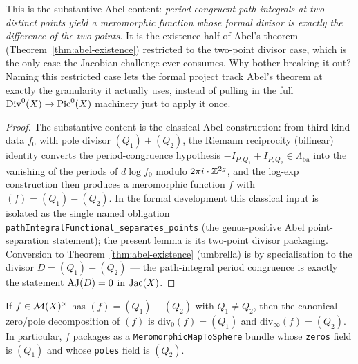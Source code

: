 \begin{layman}
This is the substantive Abel content: \emph{period-congruent path
integrals at two distinct points yield a meromorphic function whose
formal divisor is exactly the difference of the two points.} It is
the existence half of Abel's theorem (Theorem~\ref{thm:abel-existence})
restricted to the two-point divisor case, which is the only case the
Jacobian challenge ever consumes. Why bother breaking it out? Naming
this restricted case lets the formal project track Abel's theorem at
exactly the granularity it actually uses, instead of pulling in the
full \(\operatorname{Div}^0(X) \to \operatorname{Pic}^0(X)\) machinery just to apply it once.

\end{layman}

\begin{proof}\leanok
The substantive content is the classical Abel construction: from
third-kind data \(f_0\) with pole divisor \((Q_1)+(Q_2)\), the
Riemann reciprocity (bilinear) identity converts the period-congruence
hypothesis \(-I_{P,Q_1}+I_{P,Q_2}\in\Lambda_{\mathrm{ba}}\) into the
vanishing of the periods of \(d\log f_0\) modulo \(2\pi i\cdot\mathbb{Z}^{2g}\),
and the log-exp construction then produces a meromorphic function
\(f\) with \((f) = (Q_1) - (Q_2)\). In the formal development this
classical input is isolated as the single named obligation
\texttt{pathIntegralFunctional\_separates\_points} (the genus-positive
Abel point-separation statement); the present lemma is its two-point
divisor packaging. Conversion to Theorem~\ref{thm:abel-existence}
(umbrella) is by specialisation to the divisor \(D = (Q_1) - (Q_2)\)
--- the path-integral period congruence is exactly the statement
\(\operatorname{AJ}(D) = 0\) in \(\operatorname{Jac}(X)\).
\end{proof}

\begin{lemma}
\label{lem:two-point-principal-packaging}

If \(f\in\mathcal{M}(X)^\times\) has \((f) = (Q_1) - (Q_2)\) with
\(Q_1\neq Q_2\), then the canonical zero/pole decomposition of
\((f)\) is \(\mathrm{div}_0(f) = (Q_1)\) and
\(\mathrm{div}_\infty(f) = (Q_2)\). In particular, \(f\) packages as
a \texttt{MeromorphicMapToSphere} bundle whose \texttt{zeros} field
is \((Q_1)\) and whose \texttt{poles} field is \((Q_2)\).
\leanok
\end{lemma}

